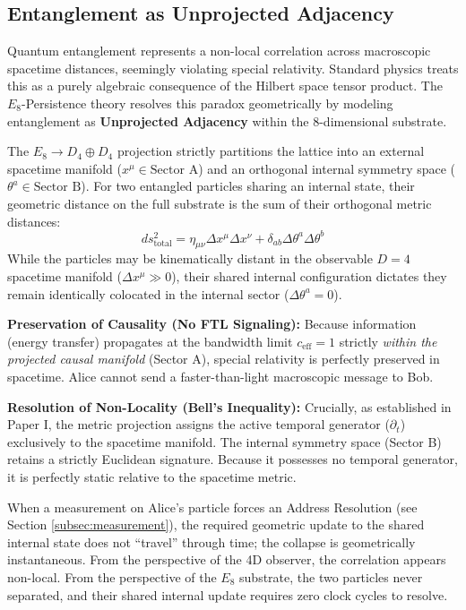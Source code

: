 \subsection{Entanglement as Unprojected Adjacency}

Quantum entanglement represents a non-local correlation across macroscopic spacetime distances, seemingly violating special relativity. Standard physics treats this as a purely algebraic consequence of the Hilbert space tensor product. The $E_8$-Persistence theory resolves this paradox geometrically by modeling entanglement as \textbf{Unprojected Adjacency} within the 8-dimensional substrate.

The $E_8 \to D_4 \oplus D_4$ projection strictly partitions the lattice into an external spacetime manifold ($x^\mu \in \text{Sector A}$) and an orthogonal internal symmetry space ($\theta^a \in \text{Sector B}$). For two entangled particles sharing an internal state, their geometric distance on the full substrate is the sum of their orthogonal metric distances:
\begin{equation}
    ds^2_{\text{total}} = \eta_{\mu\nu}\Delta x^\mu \Delta x^\nu + \delta_{ab}\Delta \theta^a \Delta \theta^b
\end{equation}
While the particles may be kinematically distant in the observable $D=4$ spacetime manifold ($\Delta x^\mu \gg 0$), their shared internal configuration dictates they remain identically colocated in the internal sector ($\Delta \theta^a = 0$). 

\textbf{Preservation of Causality (No FTL Signaling):} Because information (energy transfer) propagates at the bandwidth limit $c_{\text{eff}} = 1$ strictly \textit{within the projected causal manifold} (Sector A), special relativity is perfectly preserved in spacetime. Alice cannot send a faster-than-light macroscopic message to Bob.

\textbf{Resolution of Non-Locality (Bell's Inequality):} Crucially, as established in Paper I, the metric projection assigns the active temporal generator ($\partial_t$) exclusively to the spacetime manifold. The internal symmetry space (Sector B) retains a strictly Euclidean signature. Because it possesses no temporal generator, it is perfectly static relative to the spacetime metric. 

When a measurement on Alice's particle forces an Address Resolution (see Section \ref{subsec:measurement}), the required geometric update to the shared internal state does not ``travel'' through time; the collapse is geometrically instantaneous. From the perspective of the 4D observer, the correlation appears non-local. From the perspective of the $E_8$ substrate, the two particles never separated, and their shared internal update requires zero clock cycles to resolve.

